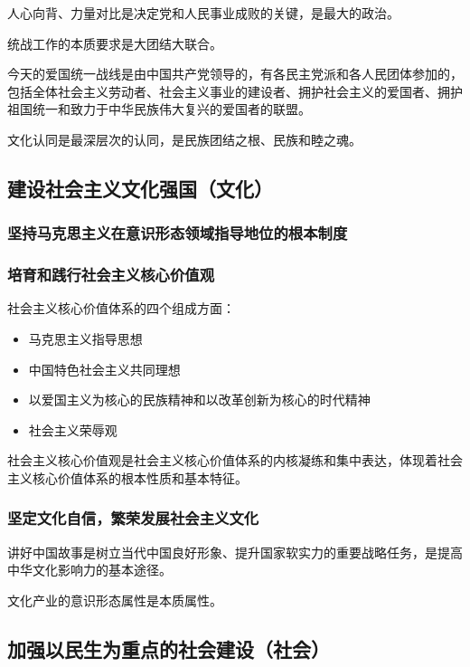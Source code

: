 \documentclass[12pt, a4paper, oneside]{ctexart}
\begin{document}
人心向背、力量对比是决定党和人民事业成败的关键，是最大的政治。

统战工作的本质要求是大团结大联合。

今天的爱国统一战线是由中国共产党领导的，有各民主党派和各人民团体参加的，包括全体社会主义劳动者、社会主义事业的建设者、拥护社会主义的爱国者、拥护祖国统一和致力于中华民族伟大复兴的爱国者的联盟。

文化认同是最深层次的认同，是民族团结之根、民族和睦之魂。

\subsection{建设社会主义文化强国（文化）}

\subsubsection{坚持马克思主义在意识形态领域指导地位的根本制度}

\subsubsection{培育和践行社会主义核心价值观}

社会主义核心价值体系的四个组成方面：
\begin{itemize}
  \item 马克思主义指导思想
  \item 中国特色社会主义共同理想
  \item 以爱国主义为核心的民族精神和以改革创新为核心的时代精神
  \item 社会主义荣辱观
\end{itemize}

社会主义核心价值观是社会主义核心价值体系的内核凝练和集中表达，体现着社会主义核心价值体系的根本性质和基本特征。

\subsubsection{坚定文化自信，繁荣发展社会主义文化}

讲好中国故事是树立当代中国良好形象、提升国家软实力的重要战略任务，是提高中华文化影响力的基本途径。

文化产业的意识形态属性是本质属性。

\subsection{加强以民生为重点的社会建设（社会）}
\end{document}
